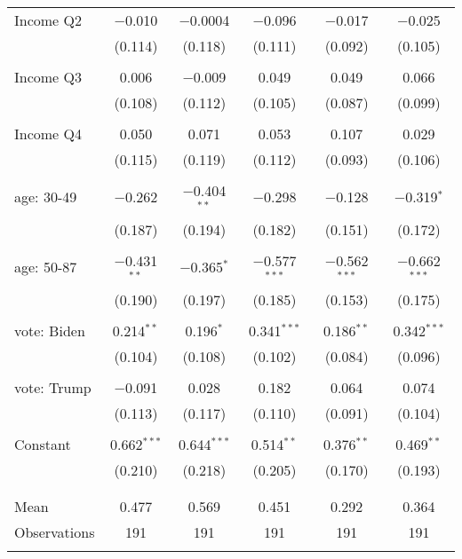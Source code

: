 \begin{tabular}{@{\extracolsep{5pt}}lccccc}
 Income Q2 & $-$0.010 & $-$0.0004 & $-$0.096 & $-$0.017 & $-$0.025 \\ 
  & (0.114) & (0.118) & (0.111) & (0.092) & (0.105) \\ 
  & & & & & \\ 
 Income Q3 & 0.006 & $-$0.009 & 0.049 & 0.049 & 0.066 \\ 
  & (0.108) & (0.112) & (0.105) & (0.087) & (0.099) \\ 
  & & & & & \\ 
 Income Q4 & 0.050 & 0.071 & 0.053 & 0.107 & 0.029 \\ 
  & (0.115) & (0.119) & (0.112) & (0.093) & (0.106) \\ 
  & & & & & \\ 
 age: 30-49 & $-$0.262 & $-$0.404$^{**}$ & $-$0.298 & $-$0.128 & $-$0.319$^{*}$ \\ 
  & (0.187) & (0.194) & (0.182) & (0.151) & (0.172) \\ 
  & & & & & \\ 
 age: 50-87 & $-$0.431$^{**}$ & $-$0.365$^{*}$ & $-$0.577$^{***}$ & $-$0.562$^{***}$ & $-$0.662$^{***}$ \\ 
  & (0.190) & (0.197) & (0.185) & (0.153) & (0.175) \\ 
  & & & & & \\ 
 vote: Biden & 0.214$^{**}$ & 0.196$^{*}$ & 0.341$^{***}$ & 0.186$^{**}$ & 0.342$^{***}$ \\ 
  & (0.104) & (0.108) & (0.102) & (0.084) & (0.096) \\ 
  & & & & & \\ 
 vote: Trump & $-$0.091 & 0.028 & 0.182 & 0.064 & 0.074 \\ 
  & (0.113) & (0.117) & (0.110) & (0.091) & (0.104) \\ 
  & & & & & \\ 
 Constant & 0.662$^{***}$ & 0.644$^{***}$ & 0.514$^{**}$ & 0.376$^{**}$ & 0.469$^{**}$ \\ 
  & (0.210) & (0.218) & (0.205) & (0.170) & (0.193) \\ 
  & & & & & \\ 
\hline \\[-1.8ex] 
Mean & 0.477 & 0.569 & 0.451 & 0.292 & 0.364 \\ 
Observations & 191 & 191 & 191 & 191 & 191 \\ 
\hline 
\hline \\[-1.8ex] 
\end{tabular} 
